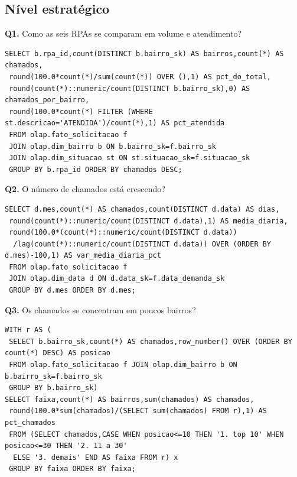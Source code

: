 \documentclass[12pt,a4paper]{article}
\begin{document}
\subsection*{Nível estratégico}
\noindent\begin{minipage}{\textwidth}
\small\textbf{Q1.} Como as seis RPAs se comparam em volume e atendimento?\par\vspace{2pt}
\begin{lstlisting}
SELECT b.rpa_id,count(DISTINCT b.bairro_sk) AS bairros,count(*) AS chamados,
 round(100.0*count(*)/sum(count(*)) OVER (),1) AS pct_do_total,
 round(count(*)::numeric/count(DISTINCT b.bairro_sk),0) AS chamados_por_bairro,
 round(100.0*count(*) FILTER (WHERE st.descricao='ATENDIDA')/count(*),1) AS pct_atendida
 FROM olap.fato_solicitacao f
 JOIN olap.dim_bairro b ON b.bairro_sk=f.bairro_sk
 JOIN olap.dim_situacao st ON st.situacao_sk=f.situacao_sk
 GROUP BY b.rpa_id ORDER BY chamados DESC;
\end{lstlisting}
\end{minipage}\par\vspace{8pt}
\noindent\begin{minipage}{\textwidth}
\small\textbf{Q2.} O número de chamados está crescendo?\par\vspace{2pt}
\begin{lstlisting}
SELECT d.mes,count(*) AS chamados,count(DISTINCT d.data) AS dias,
 round(count(*)::numeric/count(DISTINCT d.data),1) AS media_diaria,
 round(100.0*(count(*)::numeric/count(DISTINCT d.data))
  /lag(count(*)::numeric/count(DISTINCT d.data)) OVER (ORDER BY d.mes)-100,1) AS var_media_diaria_pct
 FROM olap.fato_solicitacao f
 JOIN olap.dim_data d ON d.data_sk=f.data_demanda_sk
 GROUP BY d.mes ORDER BY d.mes;
\end{lstlisting}
\end{minipage}\par\vspace{8pt}
\noindent\begin{minipage}{\textwidth}
\small\textbf{Q3.} Os chamados se concentram em poucos bairros?\par\vspace{2pt}
\begin{lstlisting}
WITH r AS (
 SELECT b.bairro_sk,count(*) AS chamados,row_number() OVER (ORDER BY count(*) DESC) AS posicao
 FROM olap.fato_solicitacao f JOIN olap.dim_bairro b ON b.bairro_sk=f.bairro_sk
 GROUP BY b.bairro_sk)
SELECT faixa,count(*) AS bairros,sum(chamados) AS chamados,
 round(100.0*sum(chamados)/(SELECT sum(chamados) FROM r),1) AS pct_chamados
 FROM (SELECT chamados,CASE WHEN posicao<=10 THEN '1. top 10' WHEN posicao<=30 THEN '2. 11 a 30'
  ELSE '3. demais' END AS faixa FROM r) x
 GROUP BY faixa ORDER BY faixa;
\end{lstlisting}
\end{minipage}\par\vspace{8pt}
\end{document}
